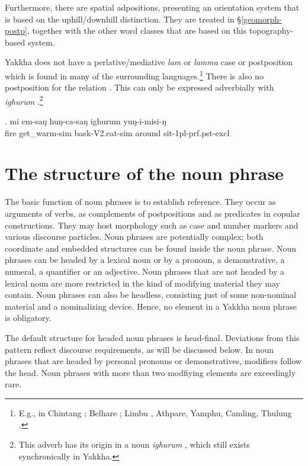 Furthermore, there are spatial adpositions,  presenting an orientation system that is based on the uphill/downhill distinction. They are treated in §\ref{geomorph-postp}, together with the other word classes that are based on this topography-based system.

 	
Yakkha does not have a perlative/mediative \emph{lam} or \emph{lamma} case or postposition which is found in many of the surrounding languages.\footnote{E.g., in Chintang \citep{Schikowski2012_Morphology}; Belhare \citep{Bickel2003Belhare}; Limbu \citep{Driem1987A-grammar}, Athpare, Yamphu, Camling, Thulung \citep{Ebert2003Kiranti}.} There is also no postposition for the relation . This can only be expressed adverbially with \emph{ighurum} \Next.\footnote{This adverb has its origin in a noun \emph{ighurum} , which still exists synchronically in Yakkha.}

	\exg.  mi   em-saŋ           huŋ-ca-saŋ            ighurum yuŋ-i-misi-ŋ\\
	fire get\_warm{\sc -sim} bask{\sc -V2.eat-sim} around sit{\sc -1pl-prf.pst-excl}\\
	 
	

\section{The structure of the noun phrase}\label{str-np}

The basic function of noun phrases is to establish reference. They occur as arguments of verbs, as complements of postpositions and as predicates in copular constructions. They may host morphology such as case and number markers  and various discourse particles. Noun phrases are potentially complex; both coordinate and embedded structures can be found inside the noun phrase. Noun phrases can be headed by a lexical noun or by a pronoun, a demonstrative, a numeral, a quantifier or an adjective. Noun phrases that are not headed by a lexical noun are more restricted in the kind of modifying material they may contain. Noun phrases can also be headless, consisting just of some non-nominal material and a nominalizing device. Hence, no element in a Yakkha noun phrase is obligatory. 

 The default structure for headed  noun phrases is head-final. Deviations from this pattern reflect discourse requirements, as will be discussed below.  In noun phrases that are headed by  personal pronouns or demonstratives, modifiers follow the head. Noun phrases with more than two modfiying elements are exceedingly rare.
 
